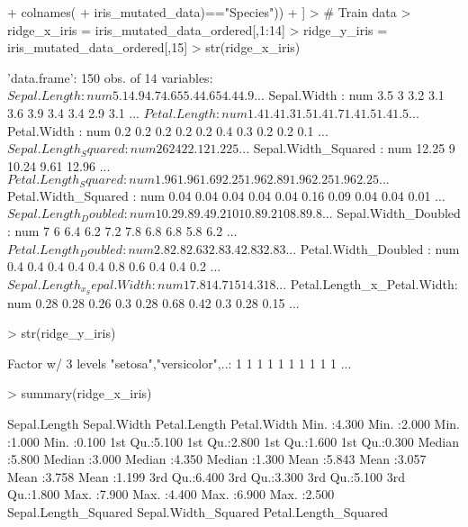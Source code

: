 \documentclass{article}
\begin{document}
\begin{Schunk}
\begin{Sinput}
+                                                       colnames(
+                                                           iris_mutated_data)=="Species"))
+                                               ]
> # Train data
> ridge_x_iris = iris_mutated_data_ordered[,1:14]
> ridge_y_iris = iris_mutated_data_ordered[,15]
> str(ridge_x_iris)
\end{Sinput}
\begin{Soutput}
'data.frame':	150 obs. of  14 variables:
 $ Sepal.Length              : num  5.1 4.9 4.7 4.6 5 5.4 4.6 5 4.4 4.9 ...
 $ Sepal.Width               : num  3.5 3 3.2 3.1 3.6 3.9 3.4 3.4 2.9 3.1 ...
 $ Petal.Length              : num  1.4 1.4 1.3 1.5 1.4 1.7 1.4 1.5 1.4 1.5 ...
 $ Petal.Width               : num  0.2 0.2 0.2 0.2 0.2 0.4 0.3 0.2 0.2 0.1 ...
 $ Sepal.Length_Squared      : num  26 24 22.1 21.2 25 ...
 $ Sepal.Width_Squared       : num  12.25 9 10.24 9.61 12.96 ...
 $ Petal.Length_Squared      : num  1.96 1.96 1.69 2.25 1.96 2.89 1.96 2.25 1.96 2.25 ...
 $ Petal.Width_Squared       : num  0.04 0.04 0.04 0.04 0.04 0.16 0.09 0.04 0.04 0.01 ...
 $ Sepal.Length_Doubled      : num  10.2 9.8 9.4 9.2 10 10.8 9.2 10 8.8 9.8 ...
 $ Sepal.Width_Doubled       : num  7 6 6.4 6.2 7.2 7.8 6.8 6.8 5.8 6.2 ...
 $ Petal.Length_Doubled      : num  2.8 2.8 2.6 3 2.8 3.4 2.8 3 2.8 3 ...
 $ Petal.Width_Doubled       : num  0.4 0.4 0.4 0.4 0.4 0.8 0.6 0.4 0.4 0.2 ...
 $ Sepal.Length_x_Sepal.Width: num  17.8 14.7 15 14.3 18 ...
 $ Petal.Length_x_Petal.Width: num  0.28 0.28 0.26 0.3 0.28 0.68 0.42 0.3 0.28 0.15 ...
\end{Soutput}
\begin{Sinput}
> str(ridge_y_iris)
\end{Sinput}
\begin{Soutput}
 Factor w/ 3 levels "setosa","versicolor",..: 1 1 1 1 1 1 1 1 1 1 ...
\end{Soutput}
\begin{Sinput}
> summary(ridge_x_iris)
\end{Sinput}
\begin{Soutput}
  Sepal.Length    Sepal.Width     Petal.Length    Petal.Width   
 Min.   :4.300   Min.   :2.000   Min.   :1.000   Min.   :0.100  
 1st Qu.:5.100   1st Qu.:2.800   1st Qu.:1.600   1st Qu.:0.300  
 Median :5.800   Median :3.000   Median :4.350   Median :1.300  
 Mean   :5.843   Mean   :3.057   Mean   :3.758   Mean   :1.199  
 3rd Qu.:6.400   3rd Qu.:3.300   3rd Qu.:5.100   3rd Qu.:1.800  
 Max.   :7.900   Max.   :4.400   Max.   :6.900   Max.   :2.500  
 Sepal.Length_Squared Sepal.Width_Squared Petal.Length_Squared

\end{Soutput}
\end{Schunk}
\end{document}
